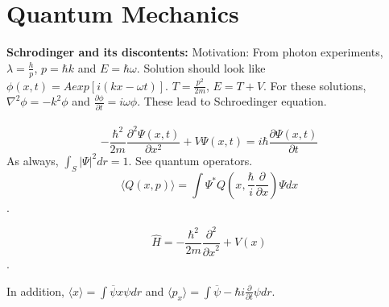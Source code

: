 \section{Quantum Mechanics}
{\bf Schrodinger and its discontents:}
Motivation:  From photon experiments, $\lambda = {\frac {h} {p}}$, $p= \hbar k$ and $E= \hbar \omega$.
Solution should look like $\phi(x,t) = A exp[i(kx- \omega t)]$. $T= {\frac{p^2} {2m}}$, $E= T+V$.  For these
solutions, $\nabla^2 \phi = -k^2 \phi$ and ${\frac {\partial \phi} {\partial t}} = i \omega \phi$.  These lead to
Schroedinger equation.
\\
\\
$$-{\frac {\hbar^2} {2m}} {\frac {\partial^2 \Psi (x, t)} {\partial x^2}} +
V \Psi(x,t)= i \hbar {\frac {\partial \Psi(x,t)} {\partial t}}$$
As always, $\int_S |\Psi|^2 dr = 1$.  See quantum operators.
\\

$$\langle Q(x,p)\rangle= 
\int \Psi^* Q(x,{\frac {\hbar} {i}}{\frac {\partial}{\partial x}}) \Psi dx$$.

$$\hat{H}= -{\frac {\hbar^2} {2m}} {\frac {\partial^2} {{\partial x}^2}} + V(x)$$.

In addition, 
$\langle x \rangle = \int \overline{\psi} x \psi dr$ and
$\langle p_x \rangle = \int \overline{\psi} - \hbar i {\frac {\partial} {\partial t}} \psi dr$.

